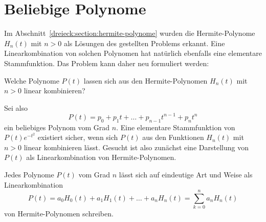 %
%
%
\section{Beliebige Polynome
\label{dreieck:section:beliebig}}
Im Abschnitt~\ref{dreieck:section:hermite-polynome} wurden die
Hermite-Polynome $H_n(t)$ mit $n>0$ als Lösungen des gestellten
Problems erkannt.
Eine Linearkombination von solchen Polynomen hat natürlich
ebenfalls eine elementare Stammfunktion.
Das Problem kann daher neu formuliert werden:

\begin{problem}
\label{dreieck:problem2}
Welche Polynome $P(t)$ lassen sich aus den Hermite-Polynomen
$H_n(t)$ mit $n>0$ linear kombinieren?
\end{problem}

Sei also
\[
P(t) = p_0 + p_1t + \ldots + p_{n-1}t^{n-1} + p_nt^n
\]
ein beliebiges Polynom vom Grad $n$.
Eine elementare Stammfunktion von $P(t)e^{-t^2}$ existiert sicher,
wenn sich $P(t)$ aus den Funktionen $H_n(t)$ mit $n>0$ linear
kombinieren lässt.
Gesucht ist also zunächst eine Darstellung von $P(t)$ als Linearkombination
von Hermite-Polynomen.

\begin{lemma}
Jedes Polynome $P(t)$ vom Grad $n$ lässt sich auf eindeutige Art und
Weise als Linearkombination
\begin{equation}
P(t) = a_0H_0(t) + a_1H_1(t) + \ldots + a_nH_n(t)
=
\sum_{k=0}^n a_nH_n(t)
\label{dreieck:lemma}
\end{equation}
von Hermite-Polynomen schreiben.
\end{lemma}

